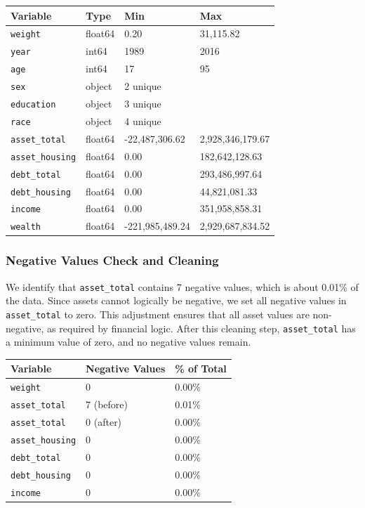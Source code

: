 \documentclass[
  12pt]{article}
\begin{document}
\begin{longtable}[]{@{}llll@{}}
\toprule\noalign{}
Variable & Type & Min & Max \\
\midrule\noalign{}
\endhead
\bottomrule\noalign{}
\endlastfoot
\texttt{weight} & float64 & 0.20 & 31,115.82 \\
\texttt{year} & int64 & 1989 & 2016 \\
\texttt{age} & int64 & 17 & 95 \\
\texttt{sex} & object & 2 unique & \\
\texttt{education} & object & 3 unique & \\
\texttt{race} & object & 4 unique & \\
\texttt{asset\_total} & float64 & -22,487,306.62 & 2,928,346,179.67 \\
\texttt{asset\_housing} & float64 & 0.00 & 182,642,128.63 \\
\texttt{debt\_total} & float64 & 0.00 & 293,486,997.64 \\
\texttt{debt\_housing} & float64 & 0.00 & 44,821,081.33 \\
\texttt{income} & float64 & 0.00 & 351,958,858.31 \\
\texttt{wealth} & float64 & -221,985,489.24 & 2,929,687,834.52 \\
\end{longtable}

\subsubsection{Negative Values Check and
Cleaning}\label{negative-values-check-and-cleaning}

We identify that \texttt{asset\_total} contains 7 negative values, which
is about 0.01\% of the data. Since assets cannot logically be negative,
we set all negative values in \texttt{asset\_total} to zero. This
adjustment ensures that all asset values are non-negative, as required
by financial logic. After this cleaning step, \texttt{asset\_total} has
a minimum value of zero, and no negative values remain.

\begin{longtable}[]{@{}lll@{}}
\toprule\noalign{}
Variable & Negative Values & \% of Total \\
\midrule\noalign{}
\endhead
\bottomrule\noalign{}
\endlastfoot
\texttt{weight} & 0 & 0.00\% \\
\texttt{asset\_total} & 7 (before) & 0.01\% \\
\texttt{asset\_total} & 0 (after) & 0.00\% \\
\texttt{asset\_housing} & 0 & 0.00\% \\
\texttt{debt\_total} & 0 & 0.00\% \\
\texttt{debt\_housing} & 0 & 0.00\% \\
\texttt{income} & 0 & 0.00\% \\
\end{longtable}
\end{document}
